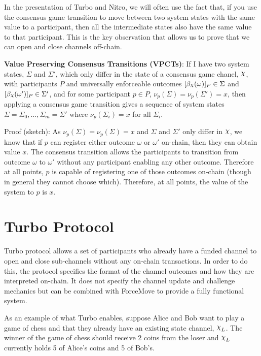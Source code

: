 \documentclass{article}
\DeclareRobustCommand{\rchi}{{\mathpalette\irchi\relax}}
\newcommand{\irchi}[2]{\raisebox{\depth}{$#1\chi$}} %
\theoremstyle{definition}
\newcommand{\enf}[1]{[#1]}
\begin{document}
In the presentation of Turbo and Nitro, we will often use the fact that, if you use the
consensus game transition to move between two system states with the same value to a
participant, then all the intermediate states also have the same value to that participant.
This is the key observation that allows us to prove that we can open and close channels
off-chain.

\textbf{Value Preserving Consensus Transitions (VPCTs)}:
If I have two system states, $\Sigma$ and $\Sigma'$, which only differ in the state of
a consensus game chanel, $\rchi$, with participants $P$ and universally enforceable outcomes
$\enf{\beta_\rchi(\omega)}_P \in \Sigma$ and $\enf{\beta_\rchi(\omega')}_P \in \Sigma'$, and 
for some participant $p \in P$, $\nu_p(\Sigma) = \nu_p(\Sigma') = x$, then
applying a consensus game transition gives a sequence of system states 
$\Sigma = \Sigma_0, \dots, \Sigma_m = \Sigma'$ where $\nu_p(\Sigma_i) = x$ for all $\Sigma_i$.

Proof (sketch): As $\nu_p(\Sigma) = \nu_p(\Sigma) = x$ and $\Sigma$ and $\Sigma'$ only differ
in $\rchi$, we know that if $p$ can register either outcome $\omega$ or $\omega'$ on-chain, then
they can obtain value $x$. The consensus transition allows the participants to transition
from outcome $\omega$ to $\omega'$ without any participant enabling any other outcome.
Therefore at all points, $p$ is capable of registering one of those outcomes on-chain (though
in general they cannot choose which).
Therefore, at all points, the value of the system to $p$ is $x$.

\section{Turbo Protocol}

Turbo protocol allows a set of participants who already have a funded channel to open and
close sub-channels without any on-chain transactions. 
In order to do this, the protocol specifies the format of the channel outcomes and how
they are interpreted on-chain.
It does not specify the channel update and challenge mechanics but can be combined with
ForceMove to provide a fully functional system.

As an example of what Turbo enables, suppose Alice and Bob want to play a game of chess and that
they already have an existing state channel, $\rchi_L$.
The winner of the game of chess should receive 2 coins from the loser and $\rchi_L$ currently holds
5 of Alice's coins and 5 of Bob's.
\end{document}
